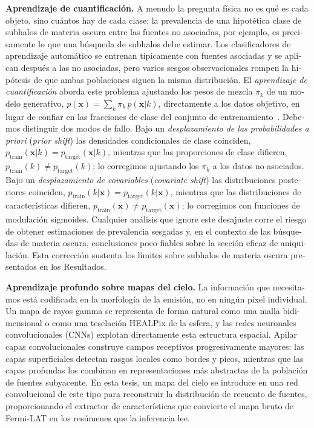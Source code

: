 \begin{otherlanguage}{spanish}
\textbf{Aprendizaje de cuantificación.} A menudo la pregunta física no es qué es cada objeto, sino cuántos hay de cada clase: la prevalencia de una hipotética clase de subhalos de materia oscura entre las fuentes no asociadas, por ejemplo, es precisamente lo que una búsqueda de subhalos debe estimar. Los clasificadores de aprendizaje automático se entrenan típicamente con fuentes asociadas y se aplican después a las no asociadas, pero varios sesgos observacionales rompen la hipótesis de que ambas poblaciones siguen la misma distribución. El \emph{aprendizaje de cuantificación} aborda este problema ajustando los pesos de mezcla $\pi_k$ de un modelo generativo, $p(\mathbf{x}) = \sum_k \pi_k\, p(\mathbf{x}|k)$, directamente a los datos objetivo, en lugar de confiar en las fracciones de clase del conjunto de entrenamiento~\cite{10.1145/3117807_Gonzalez_quantification}. Debemos distinguir dos modos de fallo. Bajo un \emph{desplazamiento de las probabilidades a priori} (\emph{prior shift}) las densidades condicionales de clase coinciden, $p_{\mathrm{train}}(\mathbf{x}|k) = p_{\mathrm{target}}(\mathbf{x}|k)$, mientras que las proporciones de clase difieren, $p_{\mathrm{train}}(k) \neq p_{\mathrm{target}}(k)$; lo corregimos ajustando los $\pi_k$ a los datos no asociados. Bajo un \emph{desplazamiento de covariables} (\emph{covariate shift}) las distribuciones posteriores coinciden, $p_{\mathrm{train}}(k|\mathbf{x}) = p_{\mathrm{target}}(k|\mathbf{x})$, mientras que las distribuciones de características difieren, $p_{\mathrm{train}}(\mathbf{x}) \neq p_{\mathrm{target}}(\mathbf{x})$; lo corregimos con funciones de modulación sigmoides. Cualquier análisis que ignore este desajuste corre el riesgo de obtener estimaciones de prevalencia sesgadas y, en el contexto de las búsquedas de materia oscura, conclusiones poco fiables sobre la sección eficaz de aniquilación. Esta corrección sustenta los límites sobre subhalos de materia oscura presentados en los Resultados.

\textbf{Aprendizaje profundo sobre mapas del cielo.} La información que necesitamos está codificada en la morfología de la emisión, no en ningún píxel individual. Un mapa de rayos gamma se representa de forma natural como una malla bidimensional o como una teselación HEALPix de la esfera, y las redes neuronales convolucionales (CNNs) explotan directamente esta estructura espacial. Apilar capas convolucionales construye campos receptivos progresivamente mayores: las capas superficiales detectan rasgos locales como bordes y picos, mientras que las capas profundas los combinan en representaciones más abstractas de la población de fuentes subyacente. En esta tesis, un mapa del cielo se introduce en una red convolucional de este tipo para reconstruir la distribución de recuento de fuentes, proporcionando el extractor de características que convierte el mapa bruto de Fermi-LAT en los resúmenes que la inferencia lee.


\end{otherlanguage}
